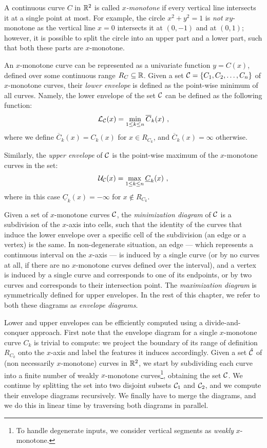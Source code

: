 
A continuous curve $C$ in $\mathbb{R}^2$ is called {\em $x$-monotone} if
every vertical line intersects it at a single point at most. For
example, the circle $x^2 + y^2 = 1$ is {\em not} $xy$-monotone as the
vertical line $x = 0$ intersects it at $(0, -1)$ and at $(0, 1)$;
however, it is possible to split the circle into an upper part and a
lower part, such that both these parts are $x$-monotone.

An $x$-monotone curve can be represented as a univariate function
$y = C(x)$, defined over some continuous range $R_C \subseteq \mathbb{R}$.
Given a set ${\cal C} = \{ C_1, C_2, \ldots, C_n \}$ of $x$-monotone
curves, their {\em lower envelope} is defined as the point-wise minimum of
all curves. Namely, the lower envelope of the set ${\cal C}$ can be
defined as the following function:
\begin{eqnarray*}
{\cal L}_{{\cal C}} (x) = \min_{1 \leq k \leq n}{\overline{C}_k (x)} \ ,
\end{eqnarray*}
where we define $\overline{C}_k(x) = C_k(x)$ for $x \in R_{C_k}$,
and $\overline{C}_k(x) = \infty$ otherwise.

Similarly, the {\em upper envelope} of ${\cal C}$ is the point-wise maximum of
the $x$-monotone curves in the set:
\begin{eqnarray*}
{\cal U}_{{\cal C}} (x) = \max_{1 \leq k \leq n}{\underline{C}_k (x)} \ ,
\end{eqnarray*}
where in this case $\underline{C}_k(x) = -\infty$ for $x \nin R_{C_k}$.

Given a set of $x$-monotone curves ${\cal C}$, the {\em minimization
diagram} of ${\cal C}$ is a subdivision of the $x$-axis into cells,
such that the identity of the curves that induce the lower envelope
over a specific cell of the subdivision (an edge or a vertex) is the
same. In non-degenerate situation, an edge --- which represents a
continuous interval on the $x$-axis --- is induced by a single
curve (or by no curves at all, if there are no $x$-monotone curves
defined over the interval), and a vertex is induced by a single curve
and corresponds to one of its endpoints, or by two curves and
corresponds to their intersection point.
The {\em maximization diagram} is symmetrically defined for upper envelopes.
In the rest of this chapter, we refer to both these diagrams as
{\em envelope diagrams}.

Lower and upper envelopes can be efficiently computed using a
divide-and-conquer approach. First note that the envelope diagram for
a single $x$-monotone curve $C_k$ is trivial to compute: we project
the boundary of its range of definition $R_{C_k}$ onto the $x$-axis
and label the features it induces accordingly. Given a set
$\hat{{\cal C}}$ of (non necessarily $x$-monotone) curves in $\mathbb{R}^2$,
we start by subdividing each curve into a finite number of weakly
$x$-monotone curves\footnote{To handle degenerate inputs, we consider
vertical segments as {\em weakly} $x$-monotone.}, obtaining the set
${\cal C}$. We continue by splitting the set into two disjoint subsets
${\cal C}_1$ and ${\cal C}_2$, and we compute their envelope diagrams
recursively. We finally have to merge the diagrams, and we do this in
linear time by traversing both diagrams in parallel.

